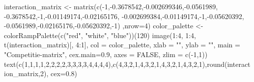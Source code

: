 \documentclass[
  a4paper,
]{scrbook}
\newenvironment{Shaded}{\begin{snugshade}}{\end{snugshade}}
\newcommand{\AttributeTok}[1]{\textcolor[rgb]{0.40,0.45,0.13}{#1}}
\newcommand{\ConstantTok}[1]{\textcolor[rgb]{0.56,0.35,0.01}{#1}}
\newcommand{\DecValTok}[1]{\textcolor[rgb]{0.68,0.00,0.00}{#1}}
\newcommand{\FloatTok}[1]{\textcolor[rgb]{0.68,0.00,0.00}{#1}}
\newcommand{\FunctionTok}[1]{\textcolor[rgb]{0.28,0.35,0.67}{#1}}
\newcommand{\NormalTok}[1]{\textcolor[rgb]{0.00,0.23,0.31}{#1}}
\newcommand{\OtherTok}[1]{\textcolor[rgb]{0.00,0.23,0.31}{#1}}
\newcommand{\SpecialCharTok}[1]{\textcolor[rgb]{0.37,0.37,0.37}{#1}}
\newcommand{\StringTok}[1]{\textcolor[rgb]{0.13,0.47,0.30}{#1}}
\theoremstyle{definition}
\theoremstyle{remark}
\begin{document}
\begin{Shaded}
\begin{Highlighting}[]
\NormalTok{  interaction\_matrix }\OtherTok{\textless{}{-}} \FunctionTok{matrix}\NormalTok{(}\FunctionTok{c}\NormalTok{(}\SpecialCharTok{{-}}\DecValTok{1}\NormalTok{,}\SpecialCharTok{{-}}\FloatTok{0.3678542}\NormalTok{,}\SpecialCharTok{{-}}\FloatTok{0.002699346}\NormalTok{,}\SpecialCharTok{{-}}\FloatTok{0.0561989}\NormalTok{,}
        \SpecialCharTok{{-}}\FloatTok{0.3678542}\NormalTok{,}\SpecialCharTok{{-}}\DecValTok{1}\NormalTok{,}\SpecialCharTok{{-}}\FloatTok{0.01149174}\NormalTok{,}\SpecialCharTok{{-}}\FloatTok{0.02165176}\NormalTok{,}
        \SpecialCharTok{{-}}\FloatTok{0.002699384}\NormalTok{,}\SpecialCharTok{{-}}\FloatTok{0.01149174}\NormalTok{,}\SpecialCharTok{{-}}\DecValTok{1}\NormalTok{,}\SpecialCharTok{{-}}\FloatTok{0.05620392}\NormalTok{,}
        \SpecialCharTok{{-}}\FloatTok{0.0561989}\NormalTok{,}\SpecialCharTok{{-}}\FloatTok{0.02165176}\NormalTok{,}\SpecialCharTok{{-}}\FloatTok{0.05620392}\NormalTok{,}\SpecialCharTok{{-}}\DecValTok{1}\NormalTok{)}
\NormalTok{                               ,}\AttributeTok{nrow=}\DecValTok{4}\NormalTok{)}
\NormalTok{  color\_palette }\OtherTok{\textless{}{-}} \FunctionTok{colorRampPalette}\NormalTok{(}\FunctionTok{c}\NormalTok{(}\StringTok{"red"}\NormalTok{, }\StringTok{"white"}\NormalTok{, }\StringTok{"blue"}\NormalTok{))(}\DecValTok{120}\NormalTok{)}
\FunctionTok{image}\NormalTok{(}\DecValTok{1}\SpecialCharTok{:}\DecValTok{4}\NormalTok{, }\DecValTok{1}\SpecialCharTok{:}\DecValTok{4}\NormalTok{, }
      \FunctionTok{t}\NormalTok{(interaction\_matrix)[, }\DecValTok{4}\SpecialCharTok{:}\DecValTok{1}\NormalTok{], }
      \AttributeTok{col =}\NormalTok{ color\_palette, }
      \AttributeTok{xlab =} \StringTok{""}\NormalTok{, }\AttributeTok{ylab =} \StringTok{""}\NormalTok{, }
      \AttributeTok{main =} \StringTok{"Competitie{-}matrix"}\NormalTok{,}
      \AttributeTok{cex.main=}\FloatTok{0.9}\NormalTok{, }\AttributeTok{axes =} \ConstantTok{FALSE}\NormalTok{, }
      \AttributeTok{zlim =} \FunctionTok{c}\NormalTok{(}\SpecialCharTok{{-}}\DecValTok{1}\NormalTok{,}\DecValTok{1}\NormalTok{))}
\FunctionTok{text}\NormalTok{(}\FunctionTok{c}\NormalTok{(}\DecValTok{1}\NormalTok{,}\DecValTok{1}\NormalTok{,}\DecValTok{1}\NormalTok{,}\DecValTok{1}\NormalTok{,}\DecValTok{2}\NormalTok{,}\DecValTok{2}\NormalTok{,}\DecValTok{2}\NormalTok{,}\DecValTok{2}\NormalTok{,}\DecValTok{3}\NormalTok{,}\DecValTok{3}\NormalTok{,}\DecValTok{3}\NormalTok{,}\DecValTok{3}\NormalTok{,}\DecValTok{4}\NormalTok{,}\DecValTok{4}\NormalTok{,}\DecValTok{4}\NormalTok{,}\DecValTok{4}\NormalTok{),}\FunctionTok{c}\NormalTok{(}\DecValTok{4}\NormalTok{,}\DecValTok{3}\NormalTok{,}\DecValTok{2}\NormalTok{,}\DecValTok{1}\NormalTok{,}\DecValTok{4}\NormalTok{,}\DecValTok{3}\NormalTok{,}\DecValTok{2}\NormalTok{,}\DecValTok{1}\NormalTok{,}\DecValTok{4}\NormalTok{,}\DecValTok{3}\NormalTok{,}\DecValTok{2}\NormalTok{,}\DecValTok{1}\NormalTok{,}\DecValTok{4}\NormalTok{,}\DecValTok{3}\NormalTok{,}\DecValTok{2}\NormalTok{,}\DecValTok{1}\NormalTok{),}\FunctionTok{round}\NormalTok{(interaction\_matrix,}\DecValTok{2}\NormalTok{), }\AttributeTok{cex=}\FloatTok{0.8}\NormalTok{)}

\end{Highlighting}
\end{Shaded}
\end{document}
